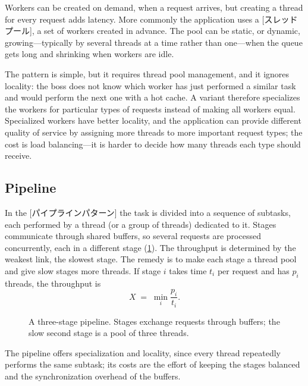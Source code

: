 \documentclass[../main.tex]{subfiles}
\begin{document}
Workers can be created on demand, when a request arrives, but creating a
thread for every request adds latency.  More commonly the application uses
a [スレッドプール], a set of workers created in
advance.
The pool can be static, or dynamic, growing---typically by several threads
at a time rather than one---when the queue gets long and shrinking when
workers are idle.

The pattern is simple, but it requires thread pool management, and it
ignores locality: the boss does not know which worker has just performed a
similar task and would perform the next one with a hot cache.  A variant
therefore specializes the workers for particular types of requests instead
of making all workers equal.  Specialized workers have better locality, and
the application can provide different quality of service by assigning more
threads to more important request types; the cost is load balancing---it is
harder to decide how many threads each type should receive.

\subsection{Pipeline}

In the [パイプラインパターン] the task is divided
into a sequence of subtasks, each performed by a thread (or a group of
threads) dedicated to it.  Stages communicate through shared buffers, so
several requests are processed concurrently, each in a different stage
(\cref{fig:l03-pipeline}).  The
throughput is determined by the weakest link, the slowest stage.  The
remedy is to make each stage a thread pool and give slow stages more
threads.  If stage $i$ takes time $t_i$ per request and has $p_i$ threads,
the throughput is
\begin{equation}
  X \;=\; \min_i \frac{p_i}{t_i} .
  \label{eq:l03-pipeline-throughput}
\end{equation}

\begin{figure}[htbp]
  \centering
  
  \caption{A three-stage pipeline.  Stages exchange requests through
    buffers; the slow second stage is a pool of three threads.}
  \label{fig:l03-pipeline}
\end{figure}
The pipeline offers specialization and locality, since every thread
repeatedly performs the same subtask; its costs are the effort of keeping
the stages balanced and the synchronization overhead of the buffers.
\end{document}
